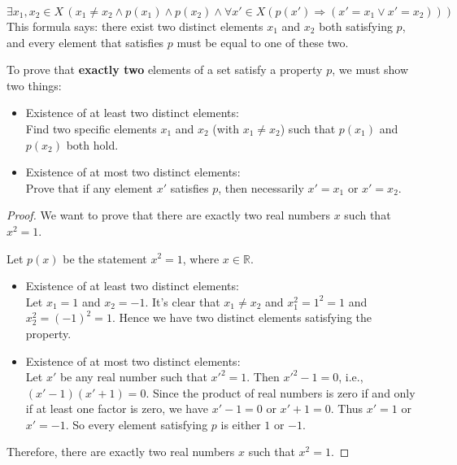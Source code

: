 \begin{mysolution}
    \[\exists x_1, x_2 \in X \, (x_1 \ne x_2 \wedge p(x_1) \wedge p(x_2) \wedge \forall x' \in X (p(x') \Rightarrow (x'=x_1 \vee x'=x_2)))\]
    This formula says: there exist two distinct elements $x_1$ and $x_2$ both satisfying $p$, and every element that satisfies $p$ must be equal to one of these two.

    To prove that \textbf{exactly two} elements of a set satisfy a property $p$, we must show two things:
    \begin{itemize}
        \item Existence of at least two distinct elements:\\
            Find two specific elements $x_1$ and $x_2$ (with $x_1 \ne x_2$) such that $p(x_1)$ and $p(x_2)$ both hold.
        \item Existence of at most two distinct elements:\\
            Prove that if any element $x'$ satisfies $p$, then necessarily $x'=x_1$ or $x'=x_2$.
    \end{itemize}

    \begin{proof}
        We want to prove that there are exactly two real numbers $x$ such that $x^2=1$.

        Let $p(x)$ be the statement $x^2=1$, where $x \in \mathbb{R}$.

        \begin{itemize}
            \item Existence of at least two distinct elements:\\
                Let $x_1 = 1$ and $x_2=-1$. It's clear that $x_1 \ne x_2$ and $x_1^2=1^2=1$ and $x_2^2=(-1)^2=1$. Hence we have two distinct elements satisfying the property.
            \item Existence of at most two distinct elements:\\
                Let $x'$ be any real number such that $x'^2=1$. Then $x'^2-1=0$, i.e., $(x'-1)(x'+1)=0$. Since the product of real numbers is zero if and only if at least one factor is zero, we have $x'-1=0$ or $x'+1=0$. Thus $x'=1$ or $x'=-1$. So every element satisfying $p$ is either $1$ or $-1$.
        \end{itemize}
        Therefore, there are exactly two real numbers $x$ such that $x^2=1$.
    \end{proof}
\end{mysolution}


